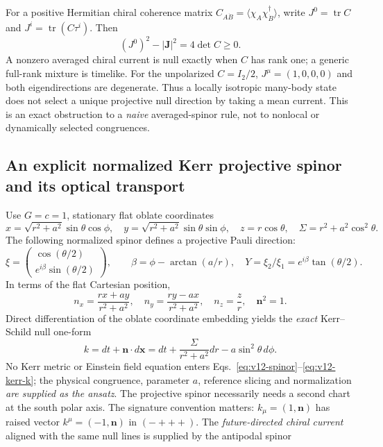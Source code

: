 \documentclass[11pt,a4paper]{article}
\begin{document}
For a positive Hermitian chiral coherence matrix $C_{A\dot B}=\langle\chi_A\chi_{\dot B}^\dagger\rangle$, write $J^0=\operatorname{tr}C$ and $J^i=\operatorname{tr}(C\tau^i)$. Then
\begin{equation}\label{eq:v12-coherence}
\boxed{(J^0)^2-|\boldsymbol J|^2=4\det C\ge0.}
\end{equation}
A nonzero averaged chiral current is null exactly when $C$ has rank one; a generic full-rank mixture is timelike. For the unpolarized $C=I_2/2$, $J^\mu=(1,0,0,0)$ and both eigendirections are degenerate. Thus a locally isotropic many-body state does not select a unique projective null direction by taking a mean current. This is an exact obstruction to a \emph{naive} averaged-spinor rule, not to nonlocal or dynamically selected congruences.

\subsection{An explicit normalized Kerr projective spinor and its optical transport}
Use $G=c=1$, stationary flat oblate coordinates
\begin{equation}\label{eq:v12-oblate}
 x=\sqrt{r^2+a^2}\sin\theta\cos\phi,\quad
 y=\sqrt{r^2+a^2}\sin\theta\sin\phi,\quad z=r\cos\theta,\quad
 \Sigma=r^2+a^2\cos^2\theta.
\end{equation}
The following normalized spinor defines a projective Pauli direction:
\begin{equation}\label{eq:v12-spinor}
\boxed{\xi=\begin{pmatrix}\cos(\theta/2)\\ e^{i\beta}\sin(\theta/2)\end{pmatrix},\qquad
\beta=\phi-\arctan(a/r),\quad Y=\xi_2/\xi_1=e^{i\beta}\tan(\theta/2).}
\end{equation}
In terms of the flat Cartesian position,
\begin{equation}\label{eq:v12-direction}
\boxed{n_x=\frac{rx+ay}{r^2+a^2},\quad
n_y=\frac{ry-ax}{r^2+a^2},\quad n_z=\frac zr,\quad \boldsymbol n^2=1.}
\end{equation}
Direct differentiation of the oblate coordinate embedding yields the \emph{exact} Kerr--Schild null one-form
\begin{equation}\label{eq:v12-kerr-k}
\boxed{k=dt+\boldsymbol n\cdot d\boldsymbol x
=dt+\frac\Sigma{r^2+a^2}dr-a\sin^2\theta\,d\phi.}
\end{equation}
No Kerr metric or Einstein field equation enters Eqs.~\eqref{eq:v12-spinor}--\eqref{eq:v12-kerr-k}; the physical congruence, parameter $a$, reference slicing and normalization \emph{are supplied as the ansatz}. The projective spinor necessarily needs a second chart at the south polar axis. The signature convention matters: $k_\mu=(1,\boldsymbol n)$ has raised vector $k^\mu=(-1,\boldsymbol n)$ in $(-+++)$. The \emph{future-directed chiral current} aligned with the same null lines is supplied by the antipodal spinor
\end{document}
